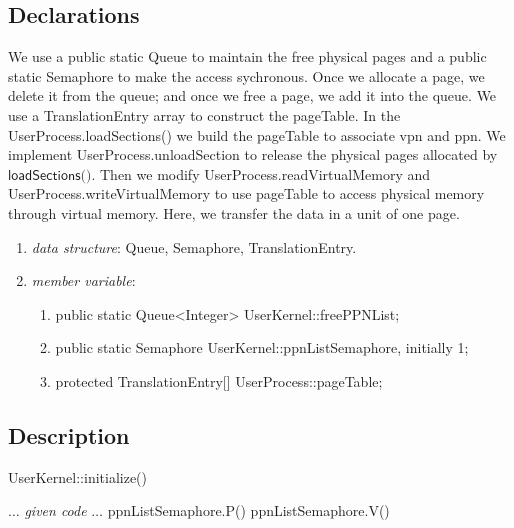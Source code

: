 \documentclass{article}
\begin{document}
\begin{spacing}{1.1}
\subsection{Declarations}
We use a public static \textsf{Queue} to maintain the free physical pages and a public
static \textsf{Semaphore} to make the access sychronous. Once we allocate a
page, we delete it from the queue; and once we free a page, we add it
into the queue. We use a 
\textsf{TranslationEntry} array to construct the pageTable. In the 
\textsf{UserProcess.loadSections()} we build the pageTable to associate vpn and ppn.
We implement \textsf{UserProcess.unloadSection} to release the physical pages
allocated by $\textsf{loadSections()}$.
Then we modify \textsf{UserProcess.readVirtualMemory} and 
\textsf{UserProcess.writeVirtualMemory} to use pageTable to access physical
memory through virtual memory. Here, we transfer the data in a unit of one page.
\begin{enumerate}[$\bullet$]
  \item \textit{data structure}: \textsf{Queue}, \textsf{Semaphore},
    \textsf{TranslationEntry}.
  \item \textit{member variable}:
    \begin{enumerate}
      \item \textsf{public static Queue<Integer> UserKernel::freePPNList};
      \item \textsf{public static Semaphore UserKernel::ppnListSemaphore}, initially 1;
      \item \textsf{protected TranslationEntry[] UserProcess::pageTable};
      \end{enumerate}
\end{enumerate}

\subsection{Description}
\begin{algorithm}
  \caption{\textsf{UserKernel::initialize()}}
  $\dots$ \textit{given code} $\dots$\;
  \textsf{ppnListSemaphore.P()}\;
  \textsf{ppnListSemaphore.V()}\;
\end{algorithm}


\end{spacing}
\end{document}
